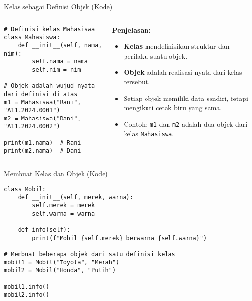 \documentclass[aspectratio=169, table]{beamer}
\begin{document}
\begin{frame}[fragile]{Kelas sebagai Definisi Objek (Kode)}
\vspace{20pt}
\begin{columns}[T]
\begin{column}{0.55\textwidth}
\begin{lstlisting}[style=PythonStyle]
# Definisi kelas Mahasiswa
class Mahasiswa:
    def __init__(self, nama, nim):
        self.nama = nama
        self.nim = nim

# Objek adalah wujud nyata dari definisi di atas
m1 = Mahasiswa("Rani", "A11.2024.0001")
m2 = Mahasiswa("Dani", "A11.2024.0002")

print(m1.nama)  # Rani
print(m2.nama)  # Dani
\end{lstlisting}
\end{column}

\begin{column}{0.4\textwidth}
\textbf{Penjelasan:}
\begin{itemize}
    \item \textbf{Kelas} mendefinisikan struktur dan perilaku suatu objek.
    \item \textbf{Objek} adalah realisasi nyata dari kelas tersebut.
    \item Setiap objek memiliki data sendiri, tetapi mengikuti cetak biru yang sama.
    \item Contoh: \texttt{m1} dan \texttt{m2} adalah dua objek dari kelas \texttt{Mahasiswa}.
\end{itemize}
\end{column}
\end{columns}
\end{frame}


\begin{frame}[fragile]{Membuat Kelas dan Objek (Kode)}
\vspace{20pt}
\begin{lstlisting}[style=PythonStyle]
class Mobil:
    def __init__(self, merek, warna):
        self.merek = merek
        self.warna = warna

    def info(self):
        print(f"Mobil {self.merek} berwarna {self.warna}")

# Membuat beberapa objek dari satu definisi kelas
mobil1 = Mobil("Toyota", "Merah")
mobil2 = Mobil("Honda", "Putih")

mobil1.info()
mobil2.info()
\end{lstlisting}
\end{frame}
\end{document}
